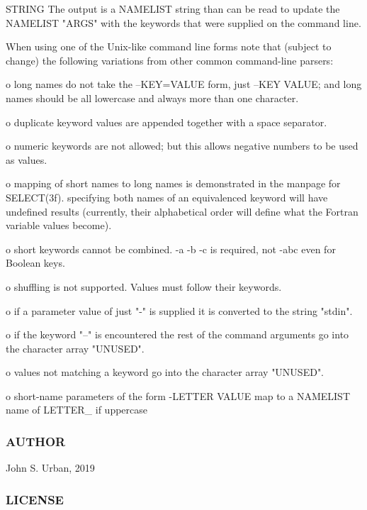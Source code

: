 \begin{DoxyVerb}  STRING   The output is a NAMELIST string than can be read to update
           the NAMELIST "ARGS" with the keywords that were supplied on
           the command line.

  When using one of the Unix-like command line forms note that
  (subject to change) the following variations from other common
  command-line parsers:

     o long names do not take the --KEY=VALUE form, just
       --KEY VALUE; and long names should be all lowercase and
       always more than one character.

     o duplicate keyword values are appended together with a space
       separator.

     o numeric keywords are not allowed; but this allows
       negative numbers to be used as values.

     o mapping of short names to long names is demonstrated in
       the manpage for SELECT(3f).
       specifying both names of an equivalenced keyword will have
       undefined results (currently, their alphabetical order
       will define what the Fortran variable values become).

     o short keywords cannot be combined. -a -b -c is required,
       not -abc even for Boolean keys.

     o shuffling is not supported. Values must follow their
       keywords.

     o if a parameter value of just "-" is supplied it is
       converted to the string "stdin".

     o if the keyword "--" is encountered the rest of the
       command arguments go into the character array "UNUSED".

     o values not matching a keyword go into the character
       array "UNUSED".

     o short-name parameters of the form -LETTER VALUE
       map to a NAMELIST name of LETTER_ if uppercase
\end{DoxyVerb}


\subsubsection*{A\+U\+T\+H\+OR}

John S. Urban, 2019 \subsubsection*{L\+I\+C\+E\+N\+SE}

